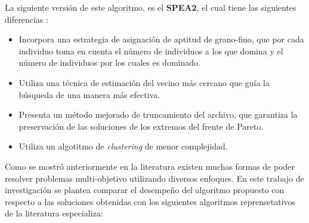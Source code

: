 \begin{itemize}
\begin{itemize}
    La siguiente versi\'on de este algoritmo, es el \textbf{SPEA2}, el cual tiene las siguientes diferencias \cite{zlt2002a}:
   
    \begin{itemize}
     \item Incorpora una estrategia de asignaci\'on de aptitud de grano-fino, que por cada individuo toma en cuenta
     el n\'umero de individuos a los que domina y el n\'umero de individuos por los cuales es dominado.
     \item Utiliza una t\'ecnica de estimaci\'on del vecino m\'as cercano que gu\'ia  la b\'usqueda de una manera
     m\'as efectiva.
     \item Presenta un m\'etodo mejorado de truncamiento del archivo, que garantiza  la preservaci\'on de las 
     soluciones de los extremos del frente de Pareto.
     \item Utiliza un algotitmo de \textit{clustering} de menor complejidad.
    \end{itemize}    
   \end{itemize}
\end{itemize}

  Como se mostr\'o anteriormente en la literatura existen muchas formas de poder resolver problemas multi-objetivo utilizando 
  diversos enfoques. En este trabajo de investigaci\'on se plantea comparar el desempe\~no del algoritmo propuesto con respecto a 
  las soluciones obtenidas con los siguientes algoritmos reprensetativos de la literatura especializa:
  
